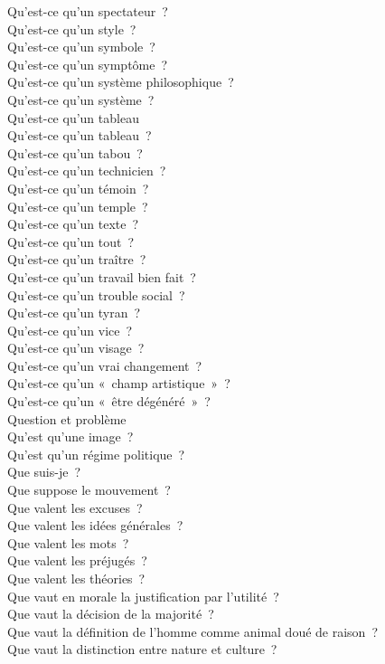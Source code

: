 \documentclass[a4paper,12pt]{article}
\begin{document}
Qu'est-ce qu'un spectateur ? \\
Qu'est-ce qu'un style ? \\
Qu'est-ce qu'un symbole ? \\
Qu'est-ce qu'un symptôme ? \\
Qu'est-ce qu'un système philosophique ? \\
Qu'est-ce qu'un système ? \\
Qu'est-ce qu'un tableau \\
Qu'est-ce qu'un tableau ? \\
Qu'est-ce qu'un tabou ? \\
Qu'est-ce qu'un technicien ? \\
Qu'est-ce qu'un témoin ? \\
Qu'est-ce qu'un temple ? \\
Qu'est-ce qu'un texte ? \\
Qu'est-ce qu'un tout ? \\
Qu'est-ce qu'un traître ? \\
Qu'est-ce qu'un travail bien fait ? \\
Qu'est-ce qu'un trouble social ? \\
Qu'est-ce qu'un tyran ? \\
Qu'est-ce qu'un vice ? \\
Qu'est-ce qu'un visage ? \\
Qu'est-ce qu'un vrai changement ? \\
Qu'est-ce qu'un « champ artistique » ? \\
Qu'est-ce qu'un « être dégénéré » ? \\
Question et problème \\
Qu'est qu'une image ? \\
Qu'est qu'un régime politique ? \\
Que suis-je ? \\
Que suppose le mouvement ? \\
Que valent les excuses ? \\
Que valent les idées générales ? \\
Que valent les mots ? \\
Que valent les préjugés ? \\
Que valent les théories ? \\
Que vaut en morale la justification par l'utilité ? \\
Que vaut la décision de la majorité ? \\
Que vaut la définition de l'homme comme animal doué de raison ? \\
Que vaut la distinction entre nature et culture ? \\
\end{document}
